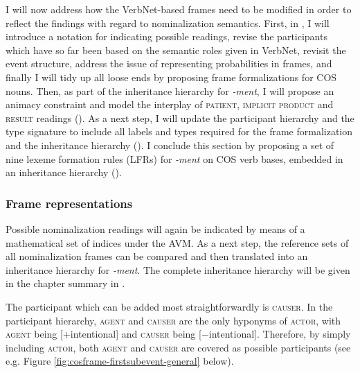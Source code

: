I will now address how the VerbNet-based frames need to be modified in order to reflect the findings with regard to nominalization semantics. 
First, in , I will introduce a notation for indicating possible readings, revise the participants which have so far been based on the semantic roles given in VerbNet, revisit the event structure, address the issue of representing probabilities in frames, and finally I will tidy up all loose ends by proposing frame formalizations for COS nouns.
Then, as part of the inheritance hierarchy for \textit{-ment}, I will propose an animacy constraint and model the interplay of \textsc{patient, implicit product} and \textsc{result} readings ().
As a next step, I will update the participant hierarchy and the type signature to include all labels and types required for the frame formalization and the inheritance hierarchy ().
I conclude this section by proposing a set of nine lexeme formation rules (LFRs) for \textit{-ment} on COS verb bases, embedded in an inheritance hierarchy ().

\subsubsection{Frame representations}
\label{sec:cos-output-formal-frames}

Possible nominalization readings will again be indicated by means of a mathematical set of indices under the AVM. 
As a next step, the reference sets of all nominalization frames can be compared and then translated into an inheritance hierarchy for \textit{-ment}. The complete inheritance hierarchy will be given in the chapter summary in . 


The participant which can be added most straightforwardly is \textsc{causer}. 
In the participant hierarchy, \textsc{agent} and \textsc{causer} are the only hyponyms of \textsc{actor}, with \textsc{agent} being  [+intentional] and \textsc{causer} being  \mbox{[−intentional]}.  
Therefore, by simply including \textsc{actor}, both \textsc{agent} and \textsc{causer} are covered as possible participants (see e.g. Figure \ref{fig:cosframe-firstsubevent-general} below).

